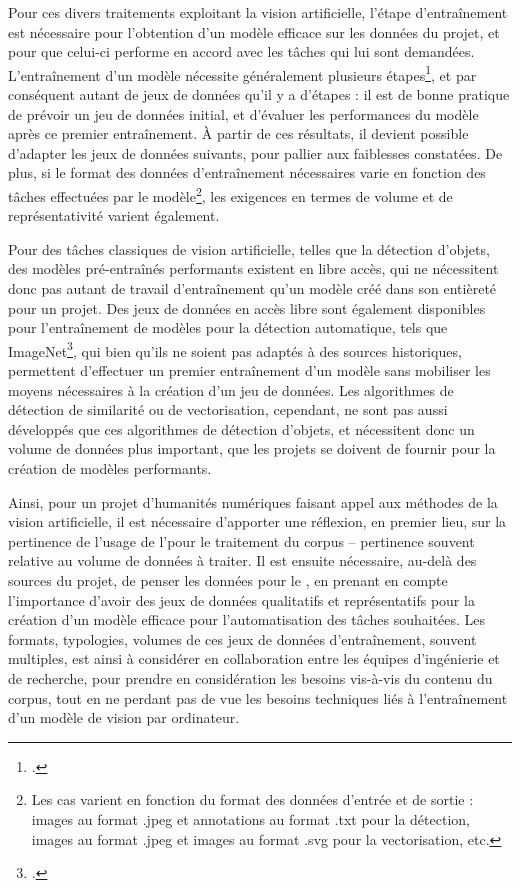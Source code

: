 Pour ces divers traitements exploitant la vision artificielle, l'étape d'entraînement est nécessaire pour l'obtention d'un modèle efficace sur les données du projet, et pour que celui-ci performe en accord avec les tâches qui lui sont demandées. L'entraînement d'un modèle nécessite généralement plusieurs étapes\footcite{strienComputerVisionHumanities2022}, et par conséquent autant de jeux de données qu'il y a d'étapes : il est de bonne pratique de prévoir un jeu de données initial, et d'évaluer les performances du modèle après ce premier entraînement. À partir de ces résultats, il devient possible d'adapter les jeux de données suivants, pour pallier aux faiblesses constatées. De plus, si le format des données d'entraînement nécessaires varie en fonction des tâches effectuées par le modèle\footnote{Les cas varient en fonction du format des données d'entrée et de sortie : images au format .jpeg et annotations au format .txt pour la détection, images au format .jpeg et images au format .svg pour la vectorisation, etc.}, les exigences en termes de volume et de représentativité varient également. 

Pour des tâches classiques de vision artificielle, telles que la détection d'objets, des modèles pré-entraînés performants existent en libre accès, qui ne nécessitent donc pas autant de travail d'entraînement qu'un modèle créé dans son entièreté pour un projet. Des jeux de données en accès libre sont également disponibles pour l'entraînement de modèles pour la détection automatique, tels que ImageNet\footcite{ImageNet}, qui bien qu'ils ne soient pas adaptés à des sources historiques, permettent d'effectuer un premier entraînement d'un modèle sans mobiliser les moyens nécessaires à la création d'un jeu de données. Les algorithmes de détection de similarité ou de vectorisation, cependant, ne sont pas aussi développés que ces algorithmes de détection d'objets, et nécessitent donc un volume de données plus important, que les projets se doivent de fournir pour la création de modèles performants.

Ainsi, pour un projet d'humanités numériques faisant appel aux méthodes de la vision artificielle, il est nécessaire d'apporter une réflexion, en premier lieu, sur la pertinence de l'usage de l'\ia pour le traitement du corpus -- pertinence souvent relative au volume de données à traiter. Il est ensuite nécessaire, au-delà des sources du projet, de penser les données pour le \dl, en prenant en compte l'importance d'avoir des jeux de données qualitatifs et représentatifs pour la création d'un modèle efficace pour l'automatisation des tâches souhaitées. Les formats, typologies, volumes de ces jeux de données d'entraînement, souvent multiples, est ainsi à considérer en collaboration entre les équipes d'ingénierie et de recherche, pour prendre en considération les besoins vis-à-vis du contenu du corpus, tout en ne perdant pas de vue les besoins techniques liés à l'entraînement d'un modèle de vision par ordinateur.
